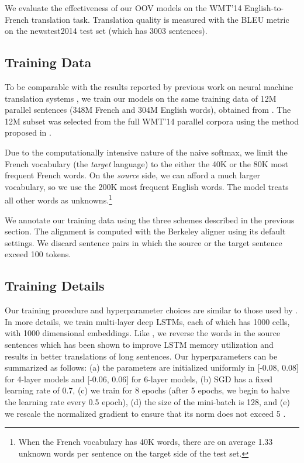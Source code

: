 We evaluate the effectiveness of our OOV models on the WMT'14 English-to-French translation 
task. Translation quality is measured with the BLEU metric \cite{Papineni02bleu} on the newstest2014 test set (which has 3003 sentences).

\subsection{Training Data}

To be comparable with the results reported by previous work on neural machine translation systems
\cite{sutskever14,cho14,bog15}, we train our models on 
the same training data of 12M parallel sentences (348M French and 304M English words), obtained from \cite{wmt14_en_fr}. 
The 12M subset was selected 
from the full WMT'14 parallel corpora using the method proposed in .%

Due to the computationally intensive nature of the naive softmax,
we limit the French vocabulary (the {\it target} language) 
to the either the 40K or the 80K most frequent French words. On the {\it source} side, 
we can afford a much larger vocabulary, so we use the 200K most frequent English words. 
The model treats all other words as unknowns.\footnote{When the French vocabulary has 40K words, there are
on average 1.33 unknown words per sentence on the target side of the test set.}

We annotate our training data using the three schemes described in the previous section. The alignment 
is computed with the Berkeley aligner \cite{liang06alignment} using its default settings.
We discard sentence pairs in which the source or the target sentence exceed 100 tokens.

\subsection{Training Details}
\label{subsec:train_details}
\begin{sloppypar}
Our training procedure and hyperparameter choices are similar to those used by
. In more details, we train multi-layer deep LSTMs, each of which has 
1000 cells, with 1000 dimensional embeddings. Like , 
we reverse the words in the source sentences which 
has been shown to improve LSTM memory utilization and results in better translations of long sentences. 
Our hyperparameters can be summarized as follows: (a) the parameters are initialized uniformly  
in [-0.08, 0.08] for 4-layer models and [-0.06, 0.06] for 6-layer models, (b) SGD has a fixed learning rate of 0.7, (c) we train for 8 epochs (after
5 epochs, we begin to halve the learning rate every 0.5 epoch), (d) the size of the mini-batch is 128, 
and (e) we rescale the normalized gradient to ensure that its norm does not
exceed 5 \cite{pascanu13}.
\end{sloppypar}

